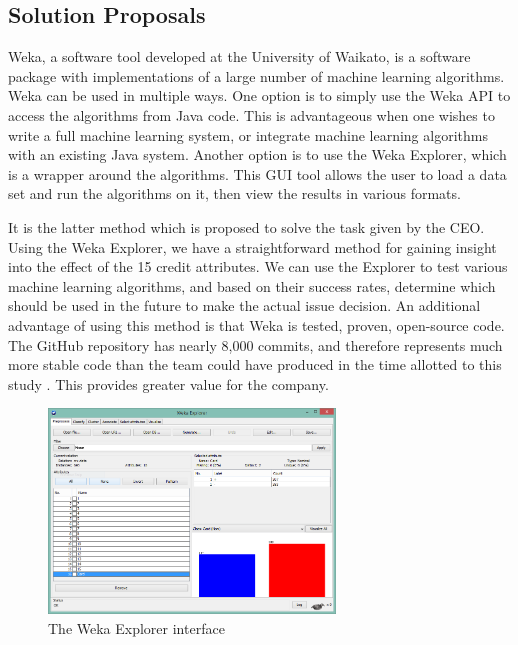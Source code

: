 \documentclass[11pt,journal]{IEEEtran}
\begin{document}
\subsection{Solution Proposals}
Weka, a software tool developed at the University of Waikato, is a software package with implementations of a large number of machine learning algorithms. Weka can be used in multiple ways. One option is to simply use the Weka API to access the algorithms from Java code. This is advantageous when one wishes to write a full machine learning system, or integrate machine learning algorithms with an existing Java system. Another option is to use the Weka Explorer, which is a wrapper around the algorithms. This GUI tool allows the user to load a data set and run the algorithms on it, then view the results in various formats.
\par
It is the latter method which is proposed to solve the task given by the CEO. Using the Weka Explorer, we have a straightforward method for gaining insight into the effect of the 15 credit attributes. We can use the Explorer to test various machine learning algorithms, and based on their success rates, determine which should be used in the future to make the actual issue decision. An additional advantage of using this method is that Weka is tested, proven, open-source code. The GitHub repository has nearly 8,000 commits, and therefore represents much more stable code than the team could have produced in the time allotted to this study \cite{wekagit}. This provides greater value for the company.

\begin{figure}[H]
\centering
    \includegraphics[width=3in]{images/wekaexplorer}
\caption{The Weka Explorer interface}
\label{wekaexplorer}
\end{figure}
\end{document}
